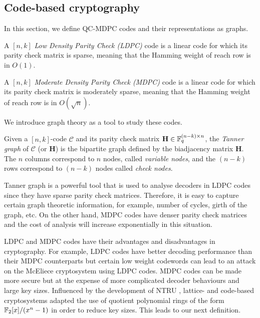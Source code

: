 \subsection{Code-based cryptography}

In this section, we define QC-MDPC codes and their representations as graphs. 

\begin{defn}
A $[n,k]$ \textit{Low Density Parity Check (LDPC)} code is a linear code for which its parity check matrix is sparse, meaning that the Hamming weight of reach row is in $O(1)$.

A $[n,k]$ \textit{Moderate Density Parity Check (MDPC)} code is a linear code for which its parity check matrix is moderately sparse, meaning that the Hamming weight of reach row is in $O(\sqrt{n})$.
\end{defn}

We introduce graph theory as a tool to study these codes.

\begin{defn}
Given a $[n,k]$-code $\mathcal{C}$ and its parity check matrix $\mathbf{H} \in \mathbb{F}_q^{(n-k) \times n}$, the \textit{Tanner graph} of $\mathcal{C}$ (or $\mathbf{H}$) is the bipartite graph defined by the biadjacency matrix $\mathbf{H}$. The $n$ columns correspond to $n$ nodes, called \textit{variable nodes}, and the $(n-k)$ rows correspond to $(n-k)$ nodes called \textit{check nodes}.
\end{defn}

Tanner graph is a powerful tool that is used to analyse decoders in LDPC codes since they have sparse parity check matrices. Therefore, it is easy to capture certain graph theoretic information, for example, number of cycles, girth of the graph, etc. On the other hand, MDPC codes have denser parity check matrices and the cost of analysis will increase exponentially in this situation.

LDPC and MDPC codes have their advantages and disadvantages in cryptography. For example, LDPC codes have better decoding performance than their MDPC counterparts but certain low weight codewords can lead to an attack on the McEliece cryptosystem using LDPC codes. MDPC codes can be made more secure but at the expense of more complicated decoder behaviours and large key sizes. Influenced by the development of NTRU \cite{ntru}, lattice- and code-based cryptosystems adapted the use of quotient polynomial rings of the form $\mathbb{F}_2[x]/(x^n -1)$ in order to reduce key sizes. This leads to our next definition.


